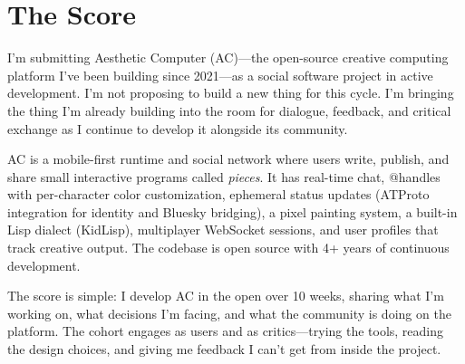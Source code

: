 \documentclass[10pt,letterpaper,twocolumn]{article}
\begin{document}



\section*{The Score}

I'm submitting Aesthetic Computer (AC)---the open-source creative computing platform I've been building since 2021---as a social software project in active development. I'm not proposing to build a new thing for this cycle. I'm bringing the thing I'm already building into the room for dialogue, feedback, and critical exchange as I continue to develop it alongside its community.

AC is a mobile-first runtime and social network where users write, publish, and share small interactive programs called \emph{pieces}. It has real-time chat, @handles with per-character color customization, ephemeral status updates (ATProto integration for identity and Bluesky bridging), a pixel painting system, a built-in Lisp dialect (KidLisp), multiplayer WebSocket sessions, and user profiles that track creative output. The codebase is open source with 4+ years of continuous development.

The score is simple: I develop AC in the open over 10 weeks, sharing what I'm working on, what decisions I'm facing, and what the community is doing on the platform. The cohort engages as users and as critics---trying the tools, reading the design choices, and giving me feedback I can't get from inside the project.
\end{document}
